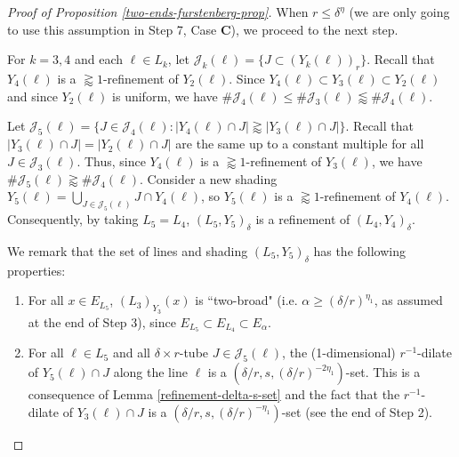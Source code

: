\documentclass{amsart}
\numberwithin{equation}{section}
\newcommand{\al}{\alpha}
\newcommand{\de}{\delta}
\newcommand{\cj}{\mathcal J}
\begin{document}
\begin{proof}[Proof of Proposition \ref{two-ends-furstenberg-prop}]
\smallskip

When $r\leq\de^\eta$ (we are only going to use this assumption in Step 7, Case {\bf C}), we proceed to the next step.


\medskip


For $k=3,4$ and each $\ell\in L_k$,  let $\cj_k(\ell)=\{J\subset(Y_k(\ell))_r\}$.
Recall that $Y_4(\ell)$ is a $\gtrapprox 1 $-refinement of $Y_2(\ell)$. 
Since $Y_4(\ell)\subset Y_3(\ell)\subset Y_2(\ell)$ and since $Y_2(\ell)$ is uniform, we have $\#\cj_4(\ell)\leq\#\cj_3 (\ell)\lessapprox\#\cj_4(\ell)$.



Let $\cj_5(\ell)=\{J\in\cj_4(\ell): |Y_4(\ell)\cap J|\gtrapprox|Y_3(\ell)\cap J|\}$. 
Recall that  $|Y_3(\ell)\cap J|=|Y_2(\ell)\cap J|$ are  the same up to a constant multiple for all $J\in\cj_3(\ell)$. 
Thus, since $Y_4(\ell)$ is a $\gtrapprox 1 $-refinement of $Y_3(\ell)$, we have $\#\cj_5(\ell)\gtrapprox\#\cj_4(\ell)$. 
Consider a new shading  $Y_5(\ell)=\bigcup_{J\in\cj_5(\ell)}J\cap Y_4(\ell)$, so $Y_5(\ell)$ is a $\gtrapprox 1 $-refinement of $Y_4(\ell)$. 
Consequently, by taking $L_5=L_4$, $(L_5,Y_5)_\de$ is a refinement of $(L_4,Y_4)_\de$.


\smallskip


We remark that the set of lines and shading $(L_5,Y_5)_\de$ has the following properties:
\begin{enumerate}
    \item For all $x\in E_{L_5}$, $(L_{3})_{Y_3}(x)$  is ``two-broad" (i.e. $\al \geq (\de/r)^{\eta_1}$, as assumed at the end of Step 3), since $E_{L_5}\subset E_{L_4}\subset E_\al$.
    \item For all $\ell\in L_5$ and all $\de\times r$-tube $J\in\cj_5(\ell)$, the (1-dimensional) $r^{-1}$-dilate of $ Y_5(\ell)\cap J$ along the line $\ell$ is a $(\de/r, s, (\de/r)^{-2\eta_1})$-set. 
    This is a consequence of Lemma \ref{refinement-delta-s-set} and the fact that the $r^{-1}$-dilate of  $Y_3(\ell)\cap J$ is a $(\de/r, s, (\de/r)^{-\eta_1})$-set (see the end of Step 2).
\end{enumerate}



\end{proof}
\end{document}

